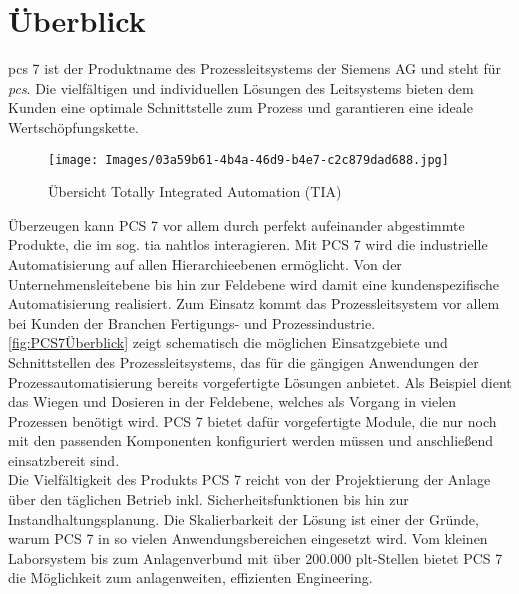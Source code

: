 \section{Überblick}
\acrshort{pcs} 7 ist der Produktname des Prozessleitsystems der Siemens AG und steht für \textit{\acrlong{pcs}}. Die vielfältigen und individuellen Lösungen des Leitsystems bieten dem Kunden eine optimale Schnittstelle zum Prozess und garantieren eine ideale Wertschöpfungskette.
\vspace{-3.0mm}
\begin{figure}[H]
    \centering
    \texttt{[image: Images/03a59b61-4b4a-46d9-b4e7-c2c879dad688.jpg]}\caption[Übersicht Totally Integrated Automation (TIA)]{Übersicht Totally Integrated Automation (TIA) \cite[S.~2]{SiemensAG2017}\label{fig:PCS7Überblick}}
\end{figure}
\vspace{-3.0mm}
Überzeugen kann PCS 7 vor allem durch perfekt aufeinander abgestimmte Produkte, die im sog. \acrfull{tia} nahtlos interagieren. Mit PCS 7 wird die industrielle Automatisierung auf allen Hierarchieebenen ermöglicht. Von der Unternehmensleitebene bis hin zur Feldebene wird damit eine kundenspezifische Automatisierung realisiert. Zum Einsatz kommt das Prozessleitsystem vor allem bei Kunden der Branchen Fertigungs- und Prozessindustrie. \cite[S.~4]{SiemensAG2017}\medskip\\
\autoref{fig:PCS7Überblick} zeigt schematisch die möglichen Einsatzgebiete und Schnittstellen des Prozessleitsystems, das für die gängigen Anwendungen der Prozessautomatisierung bereits vorgefertigte Lösungen anbietet. Als Beispiel dient das Wiegen und Dosieren in der Feldebene, welches als Vorgang in vielen Prozessen benötigt wird. PCS 7 bietet dafür vorgefertigte Module, die nur noch mit den passenden Komponenten konfiguriert werden müssen und anschließend einsatzbereit sind.\medskip\\
Die Vielfältigkeit des Produkts PCS 7 reicht von der Projektierung der Anlage über den täglichen Betrieb inkl. Sicherheitsfunktionen bis hin zur Instandhaltungsplanung. Die Skalierbarkeit der Lösung ist einer der Gründe, warum PCS 7 in so vielen Anwendungsbereichen eingesetzt wird. Vom kleinen Laborsystem bis zum Anlagenverbund mit über 200.000 \acrshort{plt}-Stellen bietet PCS 7 die Möglichkeit zum anlagenweiten, effizienten Engineering.~\cite[S.~9]{SiemensAG}
